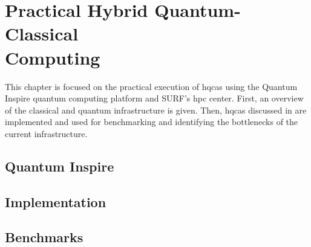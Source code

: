 \chapter[Practical Hybrid Quantum-Classical Computing]{Practical Hybrid Quantum-Classical\\Computing} \label{chap:practical-hybrid-quantum-classical-computing}
This chapter is focused on the practical execution of \glspl{hqca} using the Quantum Inspire quantum computing platform and SURF's \gls{hpc} center.
First, an overview of the classical and quantum infrastructure is given.
Then, \glspl{hqca} discussed in  are implemented and used for benchmarking and identifying the bottlenecks of the current infrastructure.

\section{Quantum Inspire}

\section{Implementation}

\section{Benchmarks}